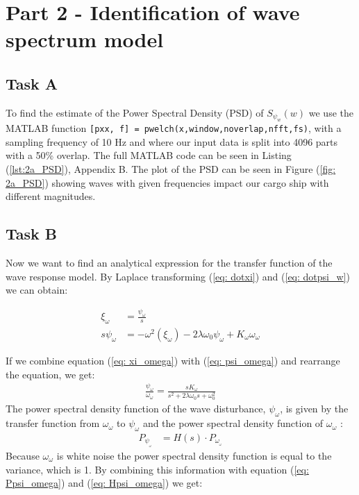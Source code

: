 \section{Part 2 - Identification of wave spectrum model}
\subsection{Task A}

To find the estimate of the Power Spectral Density (PSD) of $S_{\psi_w}(w)$ we use the MATLAB function \texttt{[pxx, f] = pwelch(x,window,noverlap,nfft,fs)}, with a sampling frequency of 10 Hz and where our input data is split into 4096 parts with a 50\% overlap. 
The full MATLAB code can be seen in Listing (\ref{lst:2a_PSD}), Appendix B. The plot of the PSD can be seen in Figure (\ref{fig: 2a_PSD}) showing waves with given frequencies impact our cargo ship with different magnitudes. 


\subsection{Task B}
Now we want to find an analytical expression for the transfer function of the wave response model. By Laplace transforming (\ref{eq: dotxi}) and (\ref{eq: dotpsi_w}) we can obtain:
\begin{equations}
    \begin{align}
        \xi_\omega &= \frac{\psi_\omega}{s} \label{eq: xi_omega}\\
        s\psi_\omega &= -\omega^2(\xi_\omega) -2\lambda\omega_0\psi_\omega + K_\omega\omega_\omega \label{eq: psi_omega}
    \end{align}
\end{equations}
\newline
If we combine equation (\ref{eq: xi_omega}) with (\ref{eq: psi_omega}) and rearrange the equation, we get:
\begin{equation}
    \begin{align}
        \frac{\psi_\omega}{\omega_\omega} = \frac{sK_\omega}{s^2 + 2\lambda\omega_0s + \omega_0^2}
        \label{eq: Hpsi_omega}
    \end{align}
\end{equation}
\newline
The power spectral density function of the wave disturbance, $\psi_\omega$, is given by the transfer function from $\omega_\omega$ to $\psi_\omega$
and the power spectral density function of $\omega_\omega$
:
\begin{equation}
    \begin{align}
        P_\psi__\omega &= H(s)\cdot P_\omega__\omega
        \label{eq: Ppsi_omega}
    \end{align}
\end{equation}
\newline
Because $\omega_\omega$ is white noise the power spectral density function is equal to the variance, which is 1. 
By combining this information with equation (\ref{eq: Ppsi_omega}) and (\ref{eq: Hpsi_omega}) we get:

